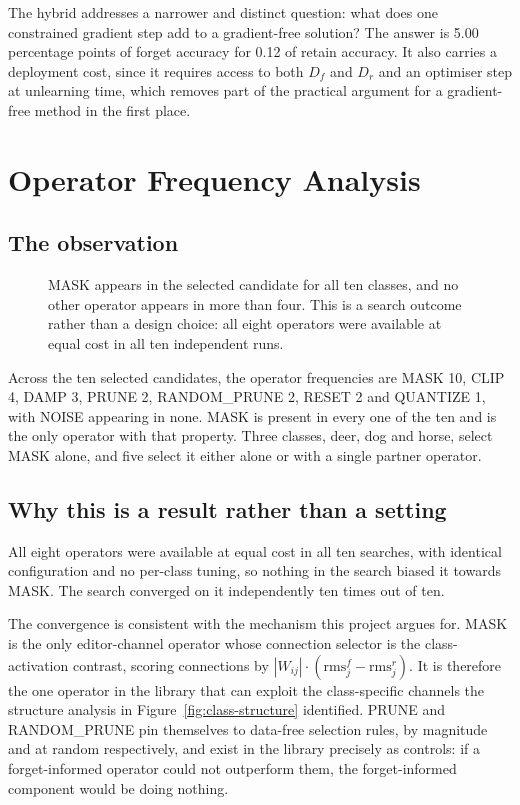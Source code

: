 The hybrid addresses a narrower and distinct question: what does one constrained
gradient step add to a gradient-free solution? The answer is 5.00 percentage
points of forget accuracy for 0.12 of retain accuracy. It also carries a
deployment cost, since it requires access to both $D_f$ and $D_r$ and an optimiser
step at unlearning time, which removes part of the practical argument for a
gradient-free method in the first place.

\section{Operator Frequency Analysis}
\label{sec:exp-operators}

\subsection{The observation}

\begin{figure}[htbp]
  \centering
  \caption{MASK appears in the selected candidate for all ten classes, and no
  other operator appears in more than four. This is a search outcome rather than a
  design choice: all eight operators were available at equal cost in all ten
  independent runs.}
  \label{fig:operator-frequency}
\end{figure}

Across the ten selected candidates, the operator frequencies are MASK 10, CLIP 4,
DAMP 3, PRUNE 2, RANDOM\_PRUNE 2, RESET 2 and QUANTIZE 1, with NOISE appearing in
none. MASK is present in every one of the ten and is the only operator with that
property. Three classes, deer, dog and horse, select MASK alone, and five select
it either alone or with a single partner operator.

\subsection{Why this is a result rather than a setting}

All eight operators were available at equal cost in all ten searches, with
identical configuration and no per-class tuning, so nothing in the search biased
it towards MASK. The search converged on it independently ten times out of ten.

The convergence is consistent with the mechanism this project argues for. MASK is
the only editor-channel operator whose connection selector is the class-activation
contrast, scoring connections by
$|W_{ij}| \cdot (\mathrm{rms}^{f}_{j} - \mathrm{rms}^{r}_{j})$. It is therefore the
one operator in the library that can exploit the class-specific channels the
structure analysis in Figure~\ref{fig:class-structure} identified. PRUNE and
RANDOM\_PRUNE pin themselves to data-free selection rules, by magnitude and at
random respectively, and exist in the library precisely as controls: if a
forget-informed operator could not outperform them, the forget-informed component
would be doing nothing.


